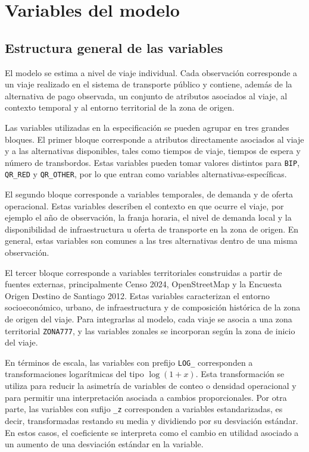 \section{Variables del modelo}

\subsection{Estructura general de las variables}

El modelo se estima a nivel de viaje individual. Cada observación corresponde a un viaje realizado en el sistema de transporte público y contiene, además de la alternativa de pago observada, un conjunto de atributos asociados al viaje, al contexto temporal y al entorno territorial de la zona de origen.

Las variables utilizadas en la especificación se pueden agrupar en tres grandes bloques. El primer bloque corresponde a atributos directamente asociados al viaje y a las alternativas disponibles, tales como tiempos de viaje, tiempos de espera y número de transbordos. Estas variables pueden tomar valores distintos para \texttt{BIP}, \texttt{QR\_RED} y \texttt{QR\_OTHER}, por lo que entran como variables alternativas-específicas.

El segundo bloque corresponde a variables temporales, de demanda y de oferta operacional. Estas variables describen el contexto en que ocurre el viaje, por ejemplo el año de observación, la franja horaria, el nivel de demanda local y la disponibilidad de infraestructura u oferta de transporte en la zona de origen. En general, estas variables son comunes a las tres alternativas dentro de una misma observación.

El tercer bloque corresponde a variables territoriales construidas a partir de fuentes externas, principalmente Censo 2024, OpenStreetMap y la Encuesta Origen Destino de Santiago 2012. Estas variables caracterizan el entorno socioeconómico, urbano, de infraestructura y de composición histórica de la zona de origen del viaje. Para integrarlas al modelo, cada viaje se asocia a una zona territorial \texttt{ZONA777}, y las variables zonales se incorporan según la zona de inicio del viaje.

En términos de escala, las variables con prefijo \texttt{LOG\_} corresponden a transformaciones logarítmicas del tipo \(\log(1+x)\). Esta transformación se utiliza para reducir la asimetría de variables de conteo o densidad operacional y para permitir una interpretación asociada a cambios proporcionales. Por otra parte, las variables con sufijo \texttt{\_z} corresponden a variables estandarizadas, es decir, transformadas restando su media y dividiendo por su desviación estándar. En estos casos, el coeficiente se interpreta como el cambio en utilidad asociado a un aumento de una desviación estándar en la variable.

